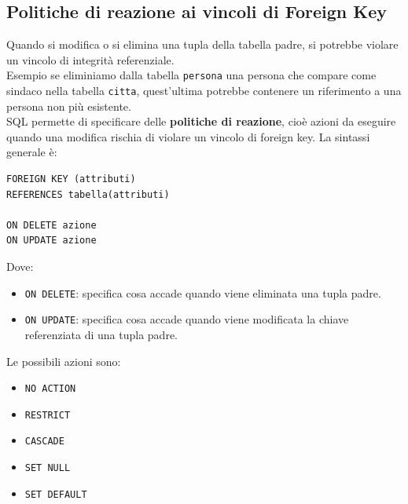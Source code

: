 \subsection{Politiche di reazione ai vincoli di Foreign Key}
Quando si modifica o si elimina una tupla
della tabella padre, si potrebbe violare
un vincolo di integrità referenziale.\\
\textcolor{verdeEsempio}{Esempio} se eliminiamo dalla tabella
\texttt{persona} una persona che compare
come sindaco nella tabella \texttt{citta},
quest'ultima potrebbe contenere un riferimento
a una persona non più esistente.\\
SQL permette di specificare delle
\textbf{politiche di reazione}, cioè azioni
da eseguire quando una modifica rischia
di violare un vincolo di foreign key.
La sintassi generale è:
\begin{verbatim}
FOREIGN KEY (attributi)
REFERENCES tabella(attributi)

ON DELETE azione
ON UPDATE azione
\end{verbatim}
Dove:
\begin{itemize}
    \item \texttt{ON DELETE}: specifica cosa accade
    quando viene eliminata una tupla padre.

    \item \texttt{ON UPDATE}: specifica cosa accade
    quando viene modificata la chiave
    referenziata di una tupla padre.
\end{itemize}
\noindent Le possibili azioni sono:
\begin{itemize}
    \item \texttt{NO ACTION}
    \item \texttt{RESTRICT}
    \item \texttt{CASCADE}
    \item \texttt{SET NULL}
    \item \texttt{SET DEFAULT}
\end{itemize}
